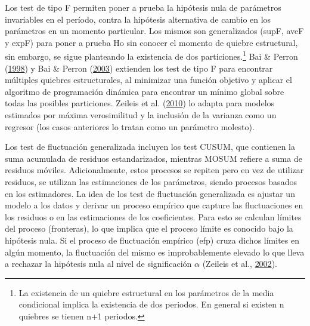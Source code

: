 \documentclass[12pt,oneside]{reedthesis}
\begin{document}
Los test de tipo F permiten poner a prueba la hipótesis nula de parámetros invariables en el período, contra la hipótesis alternativa de cambio en los parámetros en un momento particular. Los mismos son generalizados (supF, aveF y expF) para poner a prueba Ho sin conocer el momento de quiebre estructural, sin embargo, se sigue planteando la existencia de dos particiones.\footnote{La existencia de un quiebre estructural en los parámetros de la media condicional implica la existencia de dos periodos. En general si existen n quiebres se tienen n+1 periodos.} Bai \& Perron (\protect\hyperlink{ref-BaiPerron1998}{1998}) y Bai \& Perron (\protect\hyperlink{ref-BaiPerron2003}{2003}) extienden los test de tipo F para encontrar múltiples quiebres estructurales, al minimizar una función objetivo y aplicar el algoritmo de programación dinámica para encontrar un mínimo global sobre todas las posibles particiones. Zeileis et al. (\protect\hyperlink{ref-Zeileis2010}{2010}) lo adapta para modelos estimados por máxima verosimilitud y la inclusión de la varianza como un regresor (los casos anteriores lo tratan como un parámetro molesto).

Los test de fluctuación generalizada incluyen los test CUSUM, que contienen la suma acumulada de residuos estandarizados, mientras MOSUM refiere a suma de residuos móviles. Adicionalmente, estos procesos se repiten pero en vez de utilizar residuos, se utilizan las estimaciones de los parámetros, siendo procesos basados en los estimadores. La idea de los test de fluctuación generalizada es ajustar un modelo a los datos y derivar un proceso empírico que capture las fluctuaciones en los residuos o en las estimaciones de los coeficientes. Para esto se calculan límites del proceso (fronteras), lo que implica que el proceso límite es conocido bajo la hipótesis nula. Si el proceso de fluctuación empírico (efp) cruza dichos límites en algún momento, la fluctuación del mismo es improbablemente elevado lo que lleva a rechazar la hipótesis nula al nivel de significación \(\alpha\) (Zeileis et al., \protect\hyperlink{ref-Zeileis2002}{2002}).
\end{document}
